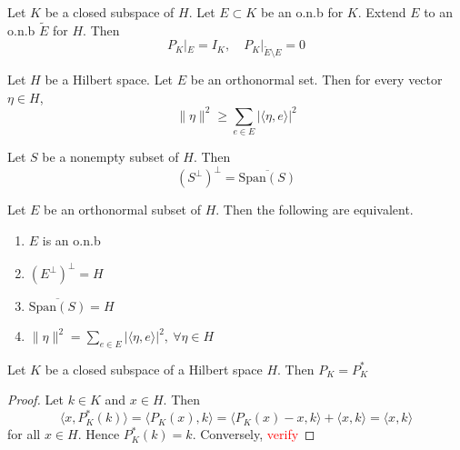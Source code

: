\begin{proposition}
  Let $K$ be a closed subspace of $H$. Let $E \subset K$ be an o.n.b
  for $K$. Extend $E$ to an o.n.b $\tilde{E}$ for $H$. Then \[
    P_K|_E = I_K, \quad P_K|_{\tilde{E} \setminus E} = 0
  \]
\end{proposition}

\begin{remark}
  Let $H$ be a Hilbert space. Let $E$ be an orthonormal set. Then for
  every vector $\eta \in H$, \[
    \|\eta\|^2 \ge \sum_{e \in E} |\langle \eta ,  e \rangle |^2
  \]
\end{remark}

\begin{lemma}
  Let $S$ be a nonempty subset of $H$. Then \[
    (S^\perp)^\perp  = \overline{\textrm{Span}(S)}
  \]
\end{lemma}

\begin{corollary}
  Let $E$ be an orthonormal subset of $H$. Then the following are equivalent.
  \begin{enumerate}[label=(\arabic*)]
    \item $E$ is an o.n.b
    \item $(E^\perp)^\perp = H$
    \item $\overline{\textrm{Span}(S)} = H$
    \item $\|\eta\|^2 = \sum_{e \in E} |\langle \eta ,  e \rangle
      |^2, \ \forall \eta \in H$
  \end{enumerate}
\end{corollary}

\begin{proposition}
  Let $K$ be a closed subspace of a Hilbert space $H$. Then $P_K = P_K^*$
\end{proposition}
\begin{proof}
  Let $k \in K$ and $x \in H$. Then \[
    \langle x , P_K^*(k) \rangle = \langle P_K(x) , k \rangle =
    \langle  P_K(x)-x , k \rangle + \langle x , k \rangle = \langle x
    , k \rangle
  \]
  for all $x \in H$.
  Hence $P_K^*(k) = k$.
  Conversely, \textcolor{red}{verify}
\end{proof}

